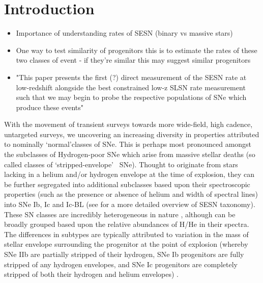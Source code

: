 \documentclass[a4paper,fleqn,usenatbib]{mnras}
\newcommand{\angus}[1]{\color{JungleGreen}#1\color{black}}
\begin{document}
\section{Introduction}
\angus{{***Apologies...I'm too lazy to add proper references at the moment so they're just commented**\\}}
\angus{{\textbf{Things to add:}}
\begin{itemize}
    \item Importance of understanding rates of SESN (binary vs massive stars)
    \item One way to test similarity of progenitors this is to estimate the rates of these two classes of event - if they're similar this may suggest similar progenitors
    \item "This paper presents the first (?) direct measurement of the SESN rate at low-redshift alongside the best constrained low-z SLSN rate measurement such that we may begin to probe the respective populations of SNe which produce these events"
\end{itemize}}

With the movement of transient surveys towards more wide-field, high cadence, untargeted surveys, we uncovering an increasing diversity in properties attributed to nominally \lq normal\rq classes of SNe. This is perhaps most pronounced amongst the subclasses of Hydrogen-poor SNe which arise from massive stellar deaths (so called classes of \lq stripped-envelope\rq~ SNe). Thought to originate from stars lacking in a helium and/or hydrogen envelope at the time of explosion, they can be further segregated into additional subclasses based upon their spectroscopic properties (such as the presence or absence of helium and width of spectral lines) into SNe Ib, Ic and Ic-BL (see {\angus{{[REFS]}}} for a more detailed overview of SESN taxonomy). These SN classes are incredibly heterogeneous in nature {\angus{{[REFS]}}}, although can be broadly grouped based upon the relative abundances of H/He in their spectra. The differences in  subtypes are typically attributed to variation in the mass of stellar envelope surrounding the progenitor at the point of explosion (whereby SNe IIb are partially stripped of their hydrogen, SNe Ib progenitors are fully stripped of any hydrogen envelopes, and SNe Ic progenitors are completely stripped of both their hydrogen and helium envelopes) {\angus{{[REFS]}}}. 
\end{document}
